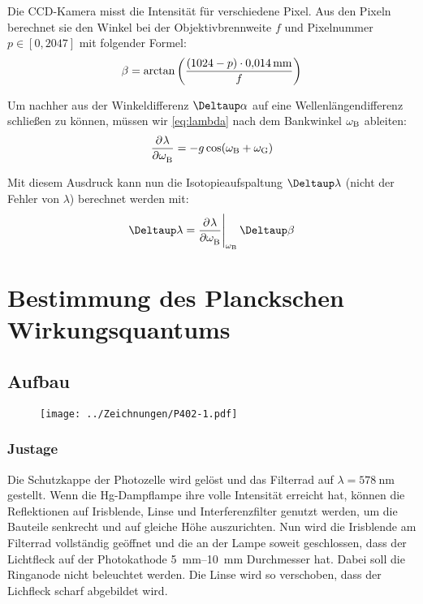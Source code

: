 Die CCD-Kamera misst die Intensität für verschiedene Pixel. Aus den Pixeln
berechnet sie den Winkel bei der Objektivbrennweite $f$ und Pixelnummer $p \in
[0, 2047]$ mit folgender Formel:
\[
    \beta = \arctan\del{\frac{(1024 - p) \cdot \SI{0.014}{\milli\meter}}f}
\]

Um nachher aus der Winkeldifferenz $\Deltaup \alpha$ auf eine
Wellenlängendifferenz schließen zu können, müssen wir \eqref{eq:lambda} nach
dem Bankwinkel $\omega_\text B$ ableiten:
\begin{equation}
    \label{eq:d_Lambda_d_beta}
    \dpd\lambda\omegaB = - g \cos(\omegaB + \omegaG)
\end{equation}

Mit diesem Ausdruck kann nun die Isotopieaufspaltung $\Deltaup \lambda$ (nicht
der Fehler von $\lambda$) berechnet werden mit:
\begin{equation}
    \label{eq:Delta_lambda}
    \Deltaup\lambda = \eval{\dpd\lambda\omegaB}_{\omegaB} \Deltaup\beta
\end{equation}


\FloatBarrier
\section{Bestimmung des Planckschen Wirkungsquantums}

\FloatBarrier
\subsection{Aufbau}

\begin{figure}[htbp]
    \centering
    \texttt{[image: ../Zeichnungen/P402-1.pdf]}
    \caption{%
        \parencite[Abbildung~P402.1]{physik412-Anleitung}
    }
    \label{fig:P402.1}
\end{figure}

\FloatBarrier
\subsubsection{Justage}

Die Schutzkappe der Photozelle wird gelöst und das Filterrad auf $\lambda =
\SI{578}{\nano\meter}$ gestellt. Wenn die Hg-Dampflampe ihre volle Intensität
erreicht hat, können die Reflektionen auf Irisblende, Linse und
Interferenzfilter genutzt werden, um die Bauteile senkrecht und auf gleiche
Höhe auszurichten. Nun wird die Irisblende am Filterrad vollständig geöffnet
und die an der Lampe soweit geschlossen, dass der Lichtfleck auf der
Photokathode \SIrange{5}{10}{\milli\meter} Durchmesser hat. Dabei soll die
Ringanode nicht beleuchtet werden. Die Linse wird so verschoben, dass der
Lichfleck scharf abgebildet wird.

